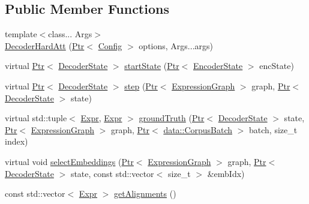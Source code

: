 \subsection*{Public Member Functions}
\begin{DoxyCompactItemize}
\item 
{\footnotesize template$<$class... Args$>$ }\\\hyperlink{classmarian_1_1DecoderHardAtt_ad3b9d947796bce9562666d12a7ccecc2}{Decoder\+Hard\+Att} (\hyperlink{namespacemarian_ad1a373be43a00ef9ce35666145137b08}{Ptr}$<$ \hyperlink{classmarian_1_1Config}{Config} $>$ options, Args...\+args)
\item 
virtual \hyperlink{namespacemarian_ad1a373be43a00ef9ce35666145137b08}{Ptr}$<$ \hyperlink{classmarian_1_1DecoderState}{Decoder\+State} $>$ \hyperlink{classmarian_1_1DecoderHardAtt_a242961c2a50950ca158b5f4965df4ef7}{start\+State} (\hyperlink{namespacemarian_ad1a373be43a00ef9ce35666145137b08}{Ptr}$<$ \hyperlink{classmarian_1_1EncoderState}{Encoder\+State} $>$ enc\+State)
\item 
virtual \hyperlink{namespacemarian_ad1a373be43a00ef9ce35666145137b08}{Ptr}$<$ \hyperlink{classmarian_1_1DecoderState}{Decoder\+State} $>$ \hyperlink{classmarian_1_1DecoderHardAtt_ab938d5649fc73437fa39a462330245bf}{step} (\hyperlink{namespacemarian_ad1a373be43a00ef9ce35666145137b08}{Ptr}$<$ \hyperlink{classmarian_1_1ExpressionGraph}{Expression\+Graph} $>$ graph, \hyperlink{namespacemarian_ad1a373be43a00ef9ce35666145137b08}{Ptr}$<$ \hyperlink{classmarian_1_1DecoderState}{Decoder\+State} $>$ state)
\item 
virtual std\+::tuple$<$ \hyperlink{namespacemarian_a498d8baf75b754011078b890b39c8e12}{Expr}, \hyperlink{namespacemarian_a498d8baf75b754011078b890b39c8e12}{Expr} $>$ \hyperlink{classmarian_1_1DecoderHardAtt_a20c5fc9460ee067576498a4e1c653706}{ground\+Truth} (\hyperlink{namespacemarian_ad1a373be43a00ef9ce35666145137b08}{Ptr}$<$ \hyperlink{classmarian_1_1DecoderState}{Decoder\+State} $>$ state, \hyperlink{namespacemarian_ad1a373be43a00ef9ce35666145137b08}{Ptr}$<$ \hyperlink{classmarian_1_1ExpressionGraph}{Expression\+Graph} $>$ graph, \hyperlink{namespacemarian_ad1a373be43a00ef9ce35666145137b08}{Ptr}$<$ \hyperlink{classmarian_1_1data_1_1CorpusBatch}{data\+::\+Corpus\+Batch} $>$ batch, size\+\_\+t index)
\item 
virtual void \hyperlink{classmarian_1_1DecoderHardAtt_a7da3e691169734a9c952c6402e13f379}{select\+Embeddings} (\hyperlink{namespacemarian_ad1a373be43a00ef9ce35666145137b08}{Ptr}$<$ \hyperlink{classmarian_1_1ExpressionGraph}{Expression\+Graph} $>$ graph, \hyperlink{namespacemarian_ad1a373be43a00ef9ce35666145137b08}{Ptr}$<$ \hyperlink{classmarian_1_1DecoderState}{Decoder\+State} $>$ state, const std\+::vector$<$ size\+\_\+t $>$ \&emb\+Idx)
\item 
const std\+::vector$<$ \hyperlink{namespacemarian_a498d8baf75b754011078b890b39c8e12}{Expr} $>$ \hyperlink{classmarian_1_1DecoderHardAtt_a1ab5187807e2cc388a0679785928b103}{get\+Alignments} ()
\end{DoxyCompactItemize}
